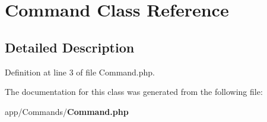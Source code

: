 \section{Command Class Reference}
\label{class_app_1_1_commands_1_1_command}


\subsection{Detailed Description}


Definition at line 3 of file Command.\+php.



The documentation for this class was generated from the following file\+:\begin{DoxyCompactItemize}
\item 
app/\+Commands/{\bf Command.\+php}\end{DoxyCompactItemize}
